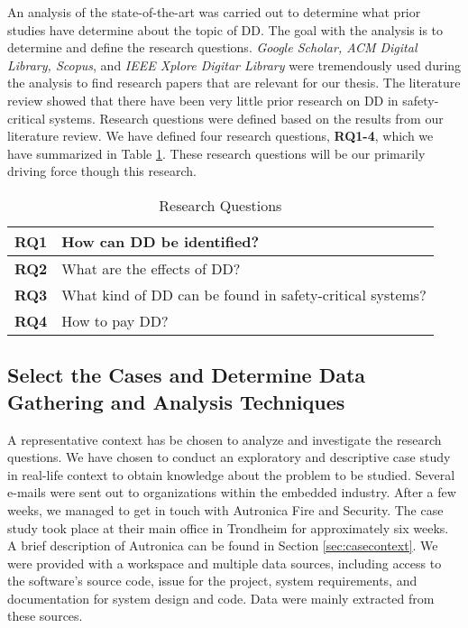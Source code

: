 An analysis of the state-of-the-art was carried out to determine what prior studies have determine about the topic of DD. The goal with the analysis is to determine and define the research questions. \textit{Google Scholar, ACM Digital Library, Scopus}, and \textit{IEEE Xplore Digitar Library} were tremendously used during the analysis to find research papers that are relevant for our thesis. The literature review showed that there have been very little prior research on DD in safety-critical systems. Research questions were defined based on the results from our literature review. We have defined four research questions, \textbf{RQ1-4}, which we have summarized in Table \ref{researchQuestionsChapter3}. These research questions will be our primarily driving force though this research.

\begin{table}[]
	\centering
	\caption{Research Questions}
	\label{researchQuestionsChapter3}
	\begin{tabular}{|l|p{8cm}|}
		\hline
		\textbf{RQ1} & How can DD be identified?     \\ \hline
		\textbf{RQ2} & What are the effects of DD?  \\ \hline
		\textbf{RQ3} & What kind of DD can be found in safety-critical systems? \\ \hline
		\textbf{RQ4} & How to pay DD? \\ \hline
	\end{tabular}
\end{table}



\subsection{Select the Cases and Determine Data Gathering and Analysis Techniques} %
A representative context has be chosen to analyze and investigate the research questions. We have chosen to conduct an exploratory and descriptive case study in real-life context to obtain knowledge about the problem to be studied. Several e-mails were sent out to organizations within the embedded industry. After a few weeks, we managed to get in touch with Autronica Fire and Security. The case study took place at their main office in Trondheim for approximately six weeks. A brief description of Autronica can be found in Section \ref{sec:casecontext}. We were provided with a workspace and multiple data sources, including access to the software's source code, issue for the project, system requirements, and documentation for system design and code. Data were mainly extracted from these sources. 

